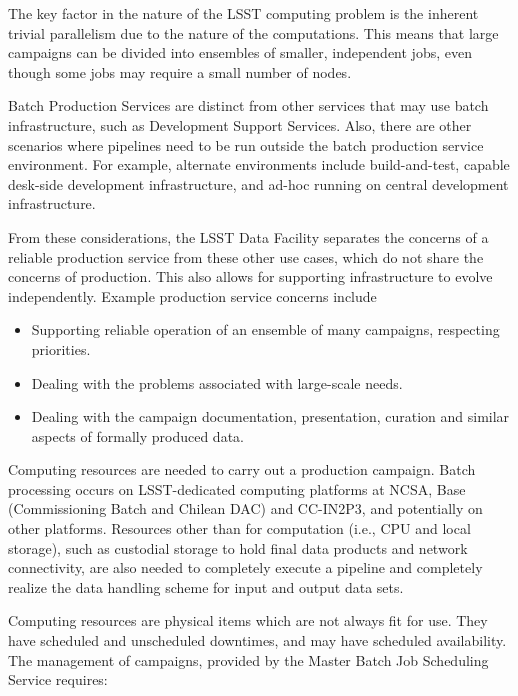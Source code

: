 The key factor in the nature of the LSST computing problem is the inherent
trivial parallelism due to the nature of the computations. This means that large
campaigns can be divided into ensembles of smaller, independent jobs, even
though some jobs may require a small number of nodes.

Batch Production Services are distinct from other services that may use batch
infrastructure, such as Development Support Services. Also, there are other
scenarios where pipelines need to be run outside the batch production service
environment.  For example, alternate environments include build-and-test,
capable desk-side development infrastructure, and ad-hoc running on central
development infrastructure.

From these considerations, the LSST Data Facility separates the concerns of a
reliable production service from these other use cases, which do not share the
concerns of production. This also allows for supporting infrastructure to evolve
independently. Example production service concerns include

\begin{itemize}

\item Supporting reliable operation of an ensemble of many campaigns, respecting
priorities.

\item Dealing with the problems associated with large-scale needs.

\item Dealing with the campaign documentation, presentation, curation and similar
aspects of formally produced data.

\end{itemize}

Computing resources are needed to carry out a production campaign. Batch processing occurs
on LSST-dedicated computing platforms at NCSA, Base (Commissioning Batch and Chilean DAC) and CC-IN2P3, and potentially on
other platforms. Resources other than for computation (i.e., CPU and local
storage), such as custodial storage to hold final data products and network
connectivity, are also needed to completely execute a pipeline and completely
realize the data handling scheme for input and output data sets.

Computing resources are physical items which are not always fit for use. They
have scheduled and unscheduled downtimes, and may have scheduled availability.
The management of campaigns, provided by the Master Batch Job Scheduling Service
requires:

